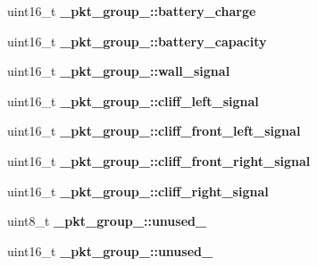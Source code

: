\begin{DoxyCompactItemize}
\item 
\hypertarget{group__roomba-lib_ga22283c5ac5d429e82cc923f42efb29f0}{}uint16\+\_\+t {\bfseries \+\_\+pkt\+\_\+group\+\_\+::battery\+\_\+charge}\label{group__roomba-lib_ga22283c5ac5d429e82cc923f42efb29f0}

\item 
\hypertarget{group__roomba-lib_ga2fe1ef419191101a8511027079014558}{}uint16\+\_\+t {\bfseries \+\_\+pkt\+\_\+group\+\_\+::battery\+\_\+capacity}\label{group__roomba-lib_ga2fe1ef419191101a8511027079014558}

\item 
\hypertarget{group__roomba-lib_ga25dfb5758c3481928fd01259472581f5}{}uint16\+\_\+t {\bfseries \+\_\+pkt\+\_\+group\+\_\+::wall\+\_\+signal}\label{group__roomba-lib_ga25dfb5758c3481928fd01259472581f5}

\item 
\hypertarget{group__roomba-lib_ga91ffc6b1dc09dc3d418c2394c5435fa3}{}uint16\+\_\+t {\bfseries \+\_\+pkt\+\_\+group\+\_\+::cliff\+\_\+left\+\_\+signal}\label{group__roomba-lib_ga91ffc6b1dc09dc3d418c2394c5435fa3}

\item 
\hypertarget{group__roomba-lib_gab156cf15990c58a4a61ecb6a268ebfa4}{}uint16\+\_\+t {\bfseries \+\_\+pkt\+\_\+group\+\_\+::cliff\+\_\+front\+\_\+left\+\_\+signal}\label{group__roomba-lib_gab156cf15990c58a4a61ecb6a268ebfa4}

\item 
\hypertarget{group__roomba-lib_ga6ad7056b713673503898d022ef765f6e}{}uint16\+\_\+t {\bfseries \+\_\+pkt\+\_\+group\+\_\+::cliff\+\_\+front\+\_\+right\+\_\+signal}\label{group__roomba-lib_ga6ad7056b713673503898d022ef765f6e}

\item 
\hypertarget{group__roomba-lib_gaa3fa03339974ede4ab6ba0215532da2b}{}uint16\+\_\+t {\bfseries \+\_\+pkt\+\_\+group\+\_\+::cliff\+\_\+right\+\_\+signal}\label{group__roomba-lib_gaa3fa03339974ede4ab6ba0215532da2b}

\item 
\hypertarget{group__roomba-lib_gab54ab066eb72c6597b14857b03e98458}{}uint8\+\_\+t {\bfseries \+\_\+pkt\+\_\+group\+\_\+::unused\+\_}\label{group__roomba-lib_gab54ab066eb72c6597b14857b03e98458}

\item 
\hypertarget{group__roomba-lib_gaedbbfb65e01c007f84cfd034208152c0}{}uint16\+\_\+t {\bfseries \+\_\+pkt\+\_\+group\+\_\+::unused\+\_}\label{group__roomba-lib_gaedbbfb65e01c007f84cfd034208152c0}


\end{DoxyCompactItemize}
